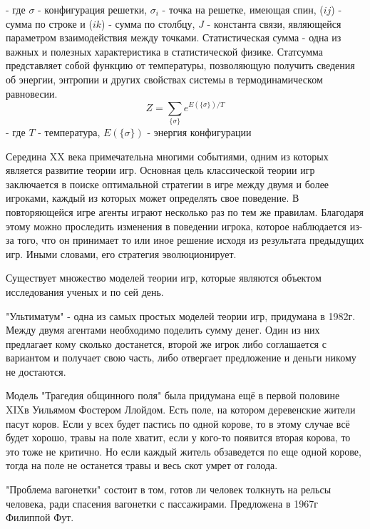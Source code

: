 \documentclass[12pt,a4paper]{article}
\begin{document}
	- где $\sigma$ - конфигурация решетки, $\sigma_{i}$ - точка на решетке, имеющая спин, ($ij$) - сумма по строке и ($ik$) - сумма по столбцу, $J$ - константа связи, являющейся параметром взаимодействия между точками. Статистическая сумма - одна из важных и полезных характеристика в статистической физике. Статсумма представляет собой функцию от температуры, позволяющую получить сведения об энергии, энтропии и других свойствах системы в термодинамическом равновесии. 
	\begin{equation}\label{statsum}
		Z = \sum_{\{\sigma\}}e^{E(\{\sigma\})/T}
	\end{equation}
	- где $T$ - температура, $E(\{\sigma\})$ - энергия конфигурации
	\par Середина XX века примечательна многими событиями, одним из которых является
	развитие теории игр. Основная цель классической теории игр заключается в поиске
	оптимальной стратегии в игре между двумя и более игроками, каждый из которых может
	определять свое поведение. В повторяющейся игре агенты играют несколько раз по 
	тем же правилам. Благодаря этому можно проследить изменения в поведении игрока,
	которое наблюдается из-за того, что он принимает то или иное решение исходя из
	результата предыдущих игр. Иными словами, его стратегия эволюционирует. 
	
	\par Существует множество моделей теории игр, которые являются объектом исследования ученых и по сей день.
	
	\par "Ультиматум" - одна из самых простых моделей теории игр, придумана в 1982г. Между двумя агентами необходимо поделить сумму денег. Один из них предлагает кому сколько достанется, второй же игрок либо соглашается с вариантом и получает свою часть, либо отвергает предложение и деньги никому не достаются. 
	
	\par Модель "Трагедия общинного поля" была придумана ещё в первой половине XIXв Уильямом Фостером Ллойдом. Есть поле, на котором деревенские жители пасут коров.
	Если у всех будет пастись по одной корове, то в этому случае всё будет хорошо, травы на поле хватит, если у кого-то появится вторая корова, то это тоже не критично. Но если каждый житель обзаведется по еще одной корове, тогда на поле не останется травы и весь скот умрет от голода. 
	\par "Проблема вагонетки" состоит в том, готов ли человек толкнуть на рельсы человека, ради спасения вагонетки с пассажирами. Предложена в 1967г Филиппой Фут. 
	
\end{document}
